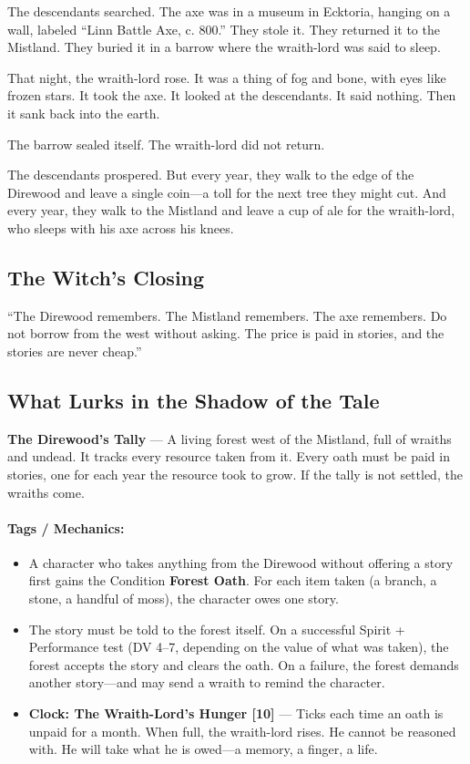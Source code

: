 \documentclass[9pt,a5paper]{extbook}
\begin{document}
The descendants searched. The axe was in a museum in Ecktoria, hanging on a wall, labeled ``Linn Battle Axe, c. 800.'' They stole it. They returned it to the Mistland. They buried it in a barrow where the wraith-lord was said to sleep.

That night, the wraith-lord rose. It was a thing of fog and bone, with eyes like frozen stars. It took the axe. It looked at the descendants. It said nothing. Then it sank back into the earth.

The barrow sealed itself. The wraith-lord did not return.

The descendants prospered. But every year, they walk to the edge of the Direwood and leave a single coin---a toll for the next tree they might cut. And every year, they walk to the Mistland and leave a cup of ale for the wraith-lord, who sleeps with his axe across his knees.

\subsection*{The Witch's Closing}

``The Direwood remembers. The Mistland remembers. The axe remembers. Do not borrow from the west without asking. The price is paid in stories, and the stories are never cheap.''

\subsection*{What Lurks in the Shadow of the Tale}

\textbf{The Direwood's Tally} --- A living forest west of the Mistland, full of wraiths and undead. It tracks every resource taken from it. Every oath must be paid in stories, one for each year the resource took to grow. If the tally is not settled, the wraiths come.

\paragraph{Tags / Mechanics:}
\begin{itemize}
    \item A character who takes anything from the Direwood without offering a story first gains the Condition \textbf{Forest Oath}. For each item taken (a branch, a stone, a handful of moss), the character owes one story.
    \item The story must be told to the forest itself. On a successful Spirit + Performance test (DV 4--7, depending on the value of what was taken), the forest accepts the story and clears the oath. On a failure, the forest demands another story---and may send a wraith to remind the character.
    \item \textbf{Clock: The Wraith-Lord's Hunger [10]} --- Ticks each time an oath is unpaid for a month. When full, the wraith-lord rises. He cannot be reasoned with. He will take what he is owed---a memory, a finger, a life.
\end{itemize}
\end{document}
